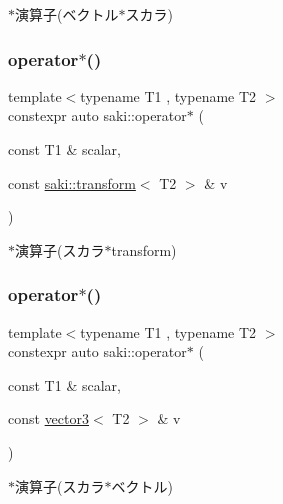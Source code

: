 $\ast$演算子(ベクトル$\ast$スカラ) 

\mbox{\label{namespacesaki_a9f06bb4644df2b78c5032c0656472d4c}} 
\subsubsection{\texorpdfstring{operator$\ast$()}{operator*()}\hspace{0.1cm}{\footnotesize\ttfamily [5/14]}}
{\footnotesize\ttfamily template$<$typename T1 , typename T2 $>$ \\
constexpr auto saki\+::operator$\ast$ (\begin{DoxyParamCaption}\item[{const T1 \&}]{scalar,  }\item[{const \mbox{\hyperlink{classsaki_1_1transform}{saki\+::transform}}$<$ T2 $>$ \&}]{v }\end{DoxyParamCaption})}



$\ast$演算子(スカラ$\ast$transform) 

\mbox{\label{namespacesaki_ab3e41594237dcaac47a2a27ed97f48f6}} 
\subsubsection{\texorpdfstring{operator$\ast$()}{operator*()}\hspace{0.1cm}{\footnotesize\ttfamily [6/14]}}
{\footnotesize\ttfamily template$<$typename T1 , typename T2 $>$ \\
constexpr auto saki\+::operator$\ast$ (\begin{DoxyParamCaption}\item[{const T1 \&}]{scalar,  }\item[{const \mbox{\hyperlink{classsaki_1_1vector3}{vector3}}$<$ T2 $>$ \&}]{v }\end{DoxyParamCaption})}



$\ast$演算子(スカラ$\ast$ベクトル) 

\mbox{\label{namespacesaki_ad1caaaf5b1af879f2d546a4b2e10974e}} 
